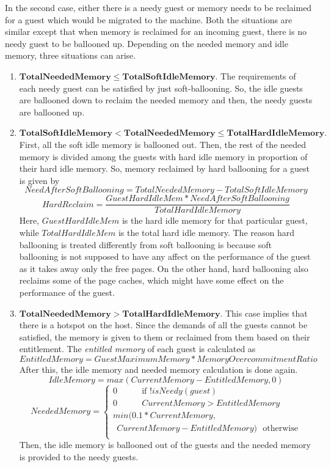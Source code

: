 In the second case, either there is a needy guest or memory needs to be reclaimed for a guest which would be migrated to the machine. Both the situations are similar except that when memory is reclaimed for an incoming guest, there is no needy guest to be ballooned up. Depending on the needed memory and idle memory, three situations can arise.
\begin{enumerate}
\item $\mathbf{Total Needed Memory \le Total SoftIdleMemory.}$ The requirements of each needy guest can be satisfied by just soft-ballooning. So, the idle guests are ballooned down to reclaim the needed memory and then, the needy guests are ballooned up.
\item $\mathbf{TotalSoftIdleMemory < Total Needed Memory \le Total HardIdleMemory.}$ First, all the soft idle memory is ballooned out. Then, the rest of the needed memory is divided among the guests with hard idle memory in proportion of their hard idle memory. So, memory reclaimed by hard ballooning for a guest is given by
$$ NeedAfterSoftBallooning = TotalNeededMemory - TotalSoftIdleMemory$$
$$ Hard Reclaim = \frac{GuestHardIdleMem*NeedAfterSoftBallooning}{TotalHardIdleMemory}$$
Here, $GuestHardIdleMem$ is the hard idle memory for that particular guest, while $TotalHardIdleMem$ is the total hard idle memory. The reason hard ballooning is treated differently from soft ballooning is because soft ballooning is not supposed to have any affect on the performance of the guest as it takes away only the free pages. On the other hand, hard ballooning also reclaims some of the page caches, which might have some effect on the performance of the guest.
\item $\mathbf{Total Needed Memory > TotalHardIdleMemory.}$ This case implies that there is a hotspot on the host. Since the demands of all the guests cannot be satisfied, the memory is given to them or reclaimed from them based on their entitlement. The \textit{entitled memory} of each guest is calculated as
$$ EntitledMemory = GuestMaximumMemory*MemoryOvercommitmentRatio$$
After this, the idle memory and needed memory calculation is done again. 
$$ Idle Memory = max(Current Memory - Entitled Memory, 0)$$
\[
Needed Memory =
  \begin{cases}
  	  0 \ \ \ \ \ \ \ \ \ \ \ \ \   \text{if $!isNeedy(guest)$}\\
      0 \ \ \ \ \ \ \ \ \ \ \ \ \  Current Memory > Entitled Memory\\
      min(0.1*CurrentMemory,\\ \ \ CurrentMemory - Entitled Memory) \ \ \  \text{otherwise} \\
  \end{cases}
\]
Then, the idle memory is ballooned out of the guests and the needed memory is provided to the needy guests.


\end{enumerate}
